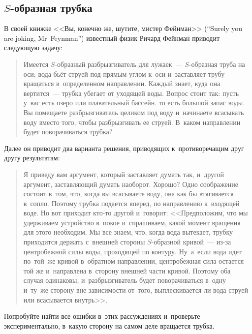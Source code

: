 \documentclass[a4paper,12pt]{article}
\begin{document}
\subsection{$S$-образная трубка}
В своей книжке <<Вы, конечно же, шутите, мистер Фейнман>> (``Surely you are joking, Mr~Feynman'')
известный физик Ричард Фейнман приводит следующую задачу:
\begin{quote} Имеется $S$-образный разбрызгиватель для лужаек~--- $S$-образная труба на оси;
вода бьёт струей под прямым углом к~оси и~заставляет трубу вращаться в~определенном направлении.
Каждый знает, куда она вертится~--- трубка убегает от уходящей воды. Вопрос стоит так: пусть у~вас
есть озеро или плавательный бассейн. то есть большой запас воды. Вы помещаете разбрызгиватель целиком
под воду и~начинаете всасывать воду вместо того, чтобы разбрызгивать ее струей. В~каком направлении
будет поворачиваться трубка?
\end{quote}
Далее он приводит два варианта решения, приводящих к~противоречащим друг другу результатам:
\begin{quote}
Я приведу вам аргумент, который заставляет думать так, и~другой аргумент, заставляющий думать наоборот. Хорошо?
Одно соображение состоит в~том, что, когда вы всасываете воду, она как бы втягивается в~сопло.
Поэтому трубка подается вперед, по направлению к~входящей воде.
Но вот приходит кто-то другой и~говорит: <<Предположим, что мы удерживаем устройство в~покое и~спрашиваем,
какой момент вращения для этого необходим. Мы все знаем, что, когда вода вытекает, трубку приходится
держать с~внешней стороны $S$-образной кривой~--- из-за центробежной силы воды, проходящей по контуру.
\hbox{Ну~а~если} вода идет по~той~же кривой в~обратном направлении, центробежная сила остается той же
и~направлена в~сторону внешней части кривой. Поэтому оба случая одинаковы, и~разбрызгиватель
будет поворачиваться в~одну и~ту~же сторону вне зависимости от~того, выплескивается ли вода
струей или всасывается внутрь>>.
\end{quote}
Попробуйте найти все ошибки в~этих рассуждениях и~проверьте экспериментально,
в~какую сторону на самом деле вращается трубка.
\end{document}
